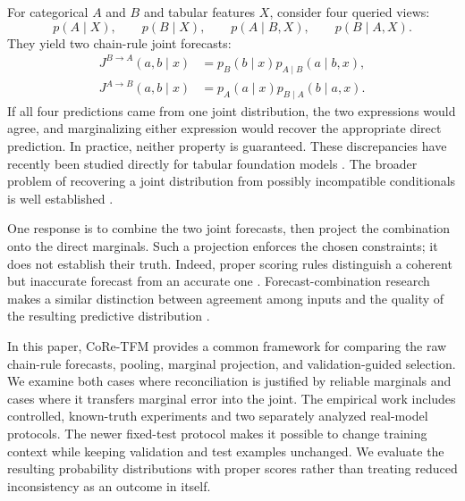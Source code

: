 \documentclass[a4paper,fleqn]{cas-sc}
\newcommand{\Jone}{J^{B\rightarrow A}}
\newcommand{\Jtwo}{J^{A\rightarrow B}}
\begin{document}
For categorical $A$ and $B$ and tabular features $X$, consider four queried views:
\begin{equation}
p(A\mid X),\qquad p(B\mid X),\qquad p(A\mid B,X),\qquad p(B\mid A,X).
\end{equation}
They yield two chain-rule joint forecasts:
\begin{align}
\Jone(a,b\mid x)&=p_B(b\mid x)p_{A\mid B}(a\mid b,x),\\
\Jtwo(a,b\mid x)&=p_A(a\mid x)p_{B\mid A}(b\mid a,x).
\end{align}
If all four predictions came from one joint distribution, the two expressions would agree, and marginalizing either expression would recover the appropriate direct prediction. In practice, neither property is guaranteed. These discrepancies have recently been studied directly for tabular foundation models \citep{klotergens2026agree}. The broader problem of recovering a joint distribution from possibly incompatible conditionals is well established \citep{majid2025consistent,mure2019compromise}.

One response is to combine the two joint forecasts, then project the combination onto the direct marginals. Such a projection enforces the chosen constraints; it does not establish their truth. Indeed, proper scoring rules distinguish a coherent but inaccurate forecast from an accurate one \citep{brier1950,gneiting2007strictly,gneiting2007calibration}. Forecast-combination research makes a similar distinction between agreement among inputs and the quality of the resulting predictive distribution \citep{genest1986combining,ranjan2010combining,gneiting2013combining}.

In this paper, CoRe-TFM provides a common framework for comparing the raw chain-rule forecasts, pooling, marginal projection, and validation-guided selection. We examine both cases where reconciliation is justified by reliable marginals and cases where it transfers marginal error into the joint. The empirical work includes controlled, known-truth experiments and two separately analyzed real-model protocols. The newer fixed-test protocol makes it possible to change training context while keeping validation and test examples unchanged. We evaluate the resulting probability distributions with proper scores rather than treating reduced inconsistency as an outcome in itself.
\end{document}
